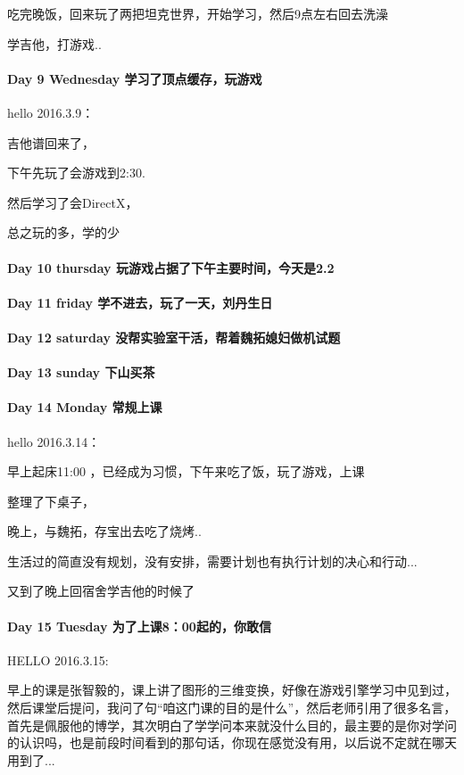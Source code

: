 \documentclass[UTF8,a4paper,8pt]{ctexbook}
\begin{document}
	 	 吃完晚饭，回来玩了两把坦克世界，开始学习，然后9点左右回去洗澡
	 	 
	 	 学吉他，打游戏..
 	 \paragraph{Day 9   Wednesday    \quad  学习了顶点缓存，玩游戏  }
	 	 hello 2016.3.9：
	 	 
		 吉他谱回来了，
		 
		 下午先玩了会游戏到2:30.
		 
		 然后学习了会DirectX，
		 
		 总之玩的多，学的少
 	 \paragraph{Day 10  thursday   \quad  玩游戏占据了下午主要时间，今天是2.2   }
 	 \paragraph{Day 11  friday   \quad    学不进去，玩了一天，刘丹生日 }
 	 \paragraph{Day 12  saturday   \quad   没帮实验室干活，帮着魏拓媳妇做机试题  }
 	 \paragraph{Day 13  sunday    \quad    下山买茶 }
 	 \paragraph{Day 14  Monday    \quad    常规上课 }
	 	 hello 2016.3.14：
	 	 
	 	 早上起床11:00 ，已经成为习惯，下午来吃了饭，玩了游戏，上课
	 	 
	 	 整理了下桌子，
	 	 
	 	 晚上，与魏拓，存宝出去吃了烧烤..
	 	 
	 	 生活过的简直没有规划，没有安排，需要计划也有执行计划的决心和行动...
	 	 
	 	 又到了晚上回宿舍学吉他的时候了  
 	 \paragraph{Day 15  Tuesday    \quad   为了上课8：00起的，你敢信  }
	 	 HELLO 2016.3.15:
	 	 
	 	 早上的课是张智毅的，课上讲了图形的三维变换，好像在游戏引擎学习中见到过，然后课堂后提问，我问了句“咱这门课的目的是什么”，然后老师引用了很多名言，首先是佩服他的博学，其次明白了学学问本来就没什么目的，最主要的是你对学问的认识吗，也是前段时间看到的那句话，你现在感觉没有用，以后说不定就在哪天用到了...
	 	 
\end{document}
